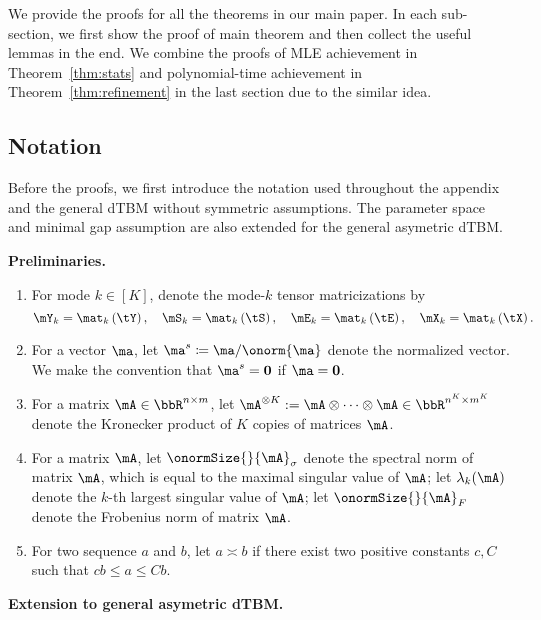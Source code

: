 \documentclass[lettersize,onecolumn,journal]{IEEEtran}
\theoremstyle{definition}
\theoremstyle{definition}
\newcommand{\of}[1]{\left(#1\right)}
\begin{document}
We provide the proofs for all the theorems in our main paper. In each sub-section, we first show the proof of main theorem and then collect the useful lemmas in the end.   {We combine the proofs of MLE achievement in Theorem~\ref{thm:stats} and polynomial-time achievement in Theorem~\ref{thm:refinement} in the last section due to the similar idea. }

\subsection{Notation}
Before the proofs, we first introduce the notation used throughout the appendix and the general dTBM without symmetric assumptions. The parameter space and minimal gap assumption are also extended for the general asymetric dTBM. 

{\bf Preliminaries.}
\begin{enumerate}[wide]
    \item For mode $ k \in [K]$, denote the mode-$k$ tensor matricizations by
    \begin{equation}
        \mY_k = \mat_k \of{ \tY }, \quad \mS_k = \mat_k \of{\tS}, \quad \mE_k = \mat_k \of{ \tE}, \quad \mX_k = \mat_k \of{\tX}.
    \end{equation}
    \item For a vector $\ma$, let $\ma^{s} \coloneqq \ma/\onorm{\ma}$ denote the normalized vector. We make the convention that $\ma^s = {\bf 0}$ if $\ma = {\bf 0}$. 
    \item For a matrix $\mA \in \bbR^{n \times m} $, let $\mA^{\otimes K}:=\mA\otimes \cdots \otimes \mA\in \bbR^{n^K \times m^K}$ denote the Kronecker product of $K$ copies of matrices $\mA $.
    \item For a matrix $\mA$, let $\onormSize{}{\mA}_\sigma$ denote the spectral norm of matrix $\mA$, which is equal to the maximal singular value of $\mA$; let $\lambda_k(\mA)$ denote the $k$-th largest singular value of $\mA$; let $\onormSize{}{\mA}_F$ denote the Frobenius norm of matrix $\mA$.
    \item For two sequence $a$ and $b$, let $a \asymp b$ if there exist two positive constants $c, C$ such that $cb \leq a\leq Cb$. 
\end{enumerate}


{\bf Extension to general asymetric dTBM.} 
 
\end{document}
